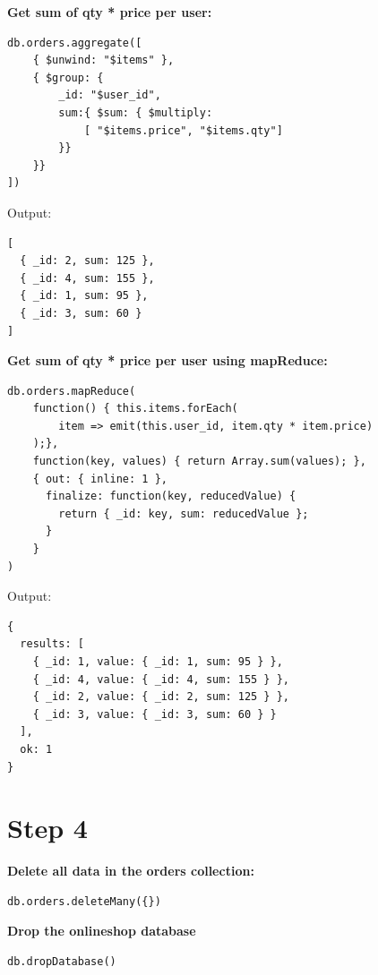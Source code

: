 \documentclass[14pt,a4paper]{extarticle}
\begin{document}
	\vspace{1cm}

	\noindent \textbf{Get sum of qty * price per user:}
	\begin{lstlisting}[style=fish]
db.orders.aggregate([ 
	{ $unwind: "$items" }, 
	{ $group: { 
		_id: "$user_id", 
		sum:{ $sum: { $multiply: 
			[ "$items.price", "$items.qty"] 
		}}
	}}
])
	\end{lstlisting}
	\noindent Output:
	\begin{lstlisting}[style=fish]
[
  { _id: 2, sum: 125 },
  { _id: 4, sum: 155 },
  { _id: 1, sum: 95 },
  { _id: 3, sum: 60 }
]
	\end{lstlisting}

\newpage

	\noindent \textbf{Get sum of qty * price per user using mapReduce:}
\begin{lstlisting}[style=fish]
db.orders.mapReduce(
	function() { this.items.forEach(
		item => emit(this.user_id, item.qty * item.price)
	);},
	function(key, values) { return Array.sum(values); },
	{ out: { inline: 1 },
	  finalize: function(key, reducedValue) {
		return { _id: key, sum: reducedValue };
	  }
	}
)
\end{lstlisting}
\noindent Output:
\begin{lstlisting}[style=fish]
{
  results: [
    { _id: 1, value: { _id: 1, sum: 95 } },
    { _id: 4, value: { _id: 4, sum: 155 } },
    { _id: 2, value: { _id: 2, sum: 125 } },
    { _id: 3, value: { _id: 3, sum: 60 } }
  ],
  ok: 1
}
\end{lstlisting}

	\newpage

	\section*{Step 4}
	\noindent \textbf{Delete all data in the orders collection:}
	\begin{lstlisting}[style=fish]
db.orders.deleteMany({})
	\end{lstlisting}

	\noindent \textbf{Drop the onlineshop database}
	\begin{lstlisting}[style=fish]
db.dropDatabase()
	\end{lstlisting}

	\newpage
\end{document}
